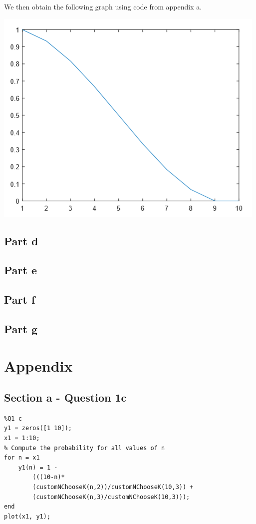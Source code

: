 \documentclass[14.5pt]{article}
\begin{document}
We then obtain the following graph using code from appendix a.
\begin{center}
    \includegraphics[scale=0.5]{p1}
\end{center}

\subsection*{Part d}
\subsection*{Part e}
\subsection*{Part f}
\subsection*{Part g}

\section*{Appendix}
\subsection*{Section a - Question 1c}
\begin{lstlisting}
%Q1 c 
y1 = zeros([1 10]);
x1 = 1:10;
% Compute the probability for all values of n
for n = x1
    y1(n) = 1 - 
        (((10-n)*
        (customNChooseK(n,2))/customNChooseK(10,3)) +
        (customNChooseK(n,3)/customNChooseK(10,3)));
end
plot(x1, y1);
\end{lstlisting}
\end{document}
